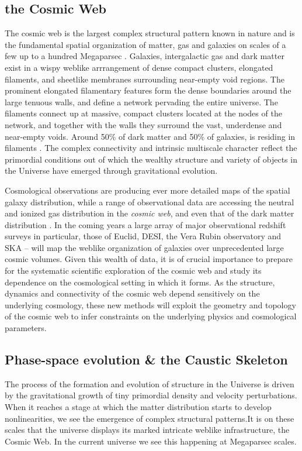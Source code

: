 \documentclass[a4paper, 11pt]{article}
\begin{document}
\subsection{the Cosmic Web}
The cosmic web is the largest complex structural pattern known in nature
and is the fundamental spatial organization of matter, gas and galaxies
on scales of a few up to a hundred Megaparsec
\citep{Shandarin:1989,Bond:1996,Weygaert:2008}. Galaxies, intergalactic
gas and dark matter exist in a wispy weblike arrrangement of dense
compact clusters, elongated filaments, and sheetlike membranes surrounding
near-empty void regions. The prominent elongated filamentary features
form the dense boundaries around the large tenuous walls, and define
a network pervading the entire universe. The filaments connect up at
massive, compact clusters located at the nodes of the network, and together
with the walls they surround the vast, underdense and near-empty voids.
Around 50\% of dark matter and 50\% of galaxies, is residing in
filaments \citep[see eg.][]{Cautun:2014,Ganeshaiah:2019}. The complex
connectivity and intrinsic multiscale character reflect the primordial
conditions out of which the wealthy structure and variety of objects in
the Universe have emerged through gravitational evolution.

Cosmological observations are producing ever more detailed maps of the
spatial galaxy distribution, while a range of observational data are
accessing
the neutral and ionized gas distribution in the \textit{cosmic web}, and
even that of the dark matter distribution \citep{references}.
In the coming years a large array of major observational redshift
surveys in particular, those of Euclid, DESI, the Vera Rubin observatory
and SKA -- will map the weblike organization of galaxies over
unprecedented large cosmic volumes. Given this wealth of data, it is of
crucial importance to prepare for the systematic scientific exploration
of the cosmic web and study its dependence on the cosmological setting
in which it forms.
As the structure, dynamics and connectivity of the cosmic web depend
sensitively on the underlying cosmology, these new methods will exploit
the geometry and topology of the cosmic web to infer constraints on the
underlying physics and cosmological parameters.

\subsection{Phase-space evolution \& the Caustic Skeleton}
The process of the formation and evolution of structure in the Universe
is driven by the gravitational growth of tiny primordial
density and velocity perturbations. When it reaches a stage at which the
matter distribution starts to develop nonlinearities, we see
the emergence of complex structural patterns.It is on these scales that
the universe displays its marked intricate weblike infrastructure,
the Cosmic Web. In the current universe we see this happening at
Megaparsec scales.
\end{document}
